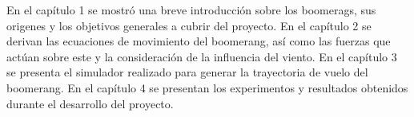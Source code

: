 	En el capítulo 1 se mostró una breve introducción sobre los boomerags, sus origenes y los objetivos generales a cubrir del proyecto. En el capítulo 2 se derivan las ecuaciones de movimiento del boomerang, así como las fuerzas que actúan sobre este y la consideración de la influencia del viento. En el capítulo 3 se presenta el simulador realizado para generar la trayectoria de vuelo del boomerang. En el capítulo 4 se presentan los experimentos y resultados obtenidos durante el desarrollo del proyecto.
